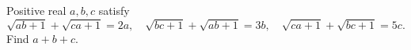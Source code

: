 Positive real $a,b,c$ satisfy
\[
\sqrt{ab+1}+\sqrt{ca+1}=2a,\quad
\sqrt{bc+1}+\sqrt{ab+1}=3b,\quad
\sqrt{ca+1}+\sqrt{bc+1}=5c.
\]
Find $a+b+c$.
